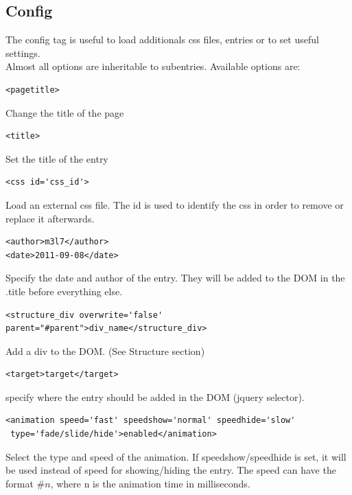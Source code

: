 \documentclass[a4paper,12pt]{article}
\begin{document}
\subsection{Config}
The config tag is useful to load additionals css files, entries or to set useful settings.\\
Almost all options are inheritable to subentries. Available options are:
\begin{list}{-}{}
\item \begin{verbatim}
<pagetitle>       
      \end{verbatim}
Change the title of the page
\item \begin{verbatim}
<title>       
      \end{verbatim}
Set the title of the entry
\item \begin{verbatim}
<css id='css_id'>       
      \end{verbatim}
Load an external css file. The id is used to identify the css in order to remove or replace it afterwards.
\item \begin{verbatim}
<author>m3l7</author>
<date>2011-09-08</date>
      \end{verbatim}
Specify the date and author of the entry. They will be added to the DOM in the .title before everything else.
\item \begin{verbatim}
<structure_div overwrite='false' parent="#parent">div_name</structure_div>       
      \end{verbatim}
Add a div to the DOM. (See Structure section)
\item \begin{verbatim}
<target>target</target>       
      \end{verbatim}
specify where the entry should be added in the DOM (jquery selector).
\item \begin{verbatim}
<animation speed='fast' speedshow='normal' speedhide='slow'
 type='fade/slide/hide'>enabled</animation>
      \end{verbatim}
Select the type and speed of the animation. If speedshow/speedhide is set, it will be used instead of speed for showing/hiding the entry.
The speed can have the format $\#n$, where n is the animation time in milliseconds.
\item \begin{verbatim}

\end{verbatim}
\end{list}
\end{document}
